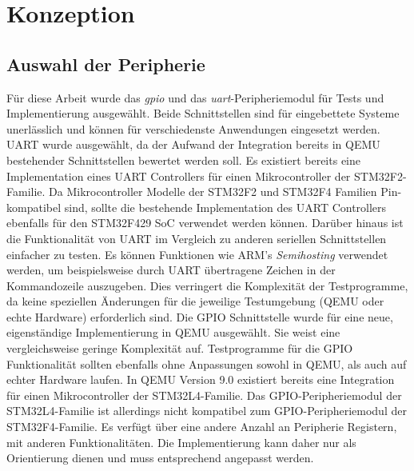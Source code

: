 

\clearpage
\chapter{Konzeption}

\section{Auswahl der Peripherie}
\label{sec:concept-periphery-selection}

Für diese Arbeit wurde das \textit{\ac{gpio}} und das
\textit{\ac{uart}}-Peripheriemodul für Tests und Implementierung ausgewählt.
Beide Schnittstellen sind für eingebettete Systeme unerlässlich und können für
verschiedenste Anwendungen eingesetzt werden.
\newline
UART wurde ausgewählt, da der Aufwand der Integration bereits in QEMU
bestehender Schnittstellen bewertet werden soll.
Es existiert bereits eine Implementation eines UART Controllers für einen
Mikrocontroller der STM32F2-Familie.
Da Mikrocontroller Modelle der STM32F2 und STM32F4 Familien Pin-kompatibel
sind, sollte die bestehende Implementation des UART Controllers ebenfalls
für den STM32F429 SoC verwendet werden können.
Darüber hinaus ist die Funktionalität von UART im Vergleich zu anderen
seriellen Schnittstellen einfacher zu testen.
Es können Funktionen wie ARM's \textit{Semihosting} verwendet werden, um
beispielsweise durch UART übertragene Zeichen in der Kommandozeile auszugeben.
Dies verringert die Komplexität der Testprogramme, da keine speziellen
Änderungen für die jeweilige Testumgebung (QEMU oder echte Hardware)
erforderlich sind.
\newline
Die GPIO Schnittstelle wurde für eine neue, eigenständige Implementierung in
QEMU ausgewählt.
Sie weist eine vergleichsweise geringe Komplexität auf.
Testprogramme für die GPIO Funktionalität sollten ebenfalls ohne Anpassungen
sowohl in QEMU, als auch auf echter Hardware laufen.
In QEMU Version 9.0 existiert bereits eine Integration für einen
Mikrocontroller der STM32L4-Familie.
Das GPIO-Peripheriemodul der STM32L4-Familie ist allerdings nicht kompatibel
zum GPIO-Peripheriemodul der STM32F4-Familie.
Es verfügt über eine andere Anzahl an Peripherie Registern, mit anderen
Funktionalitäten.
Die Implementierung kann daher nur als Orientierung dienen und muss
entsprechend angepasst werden.

